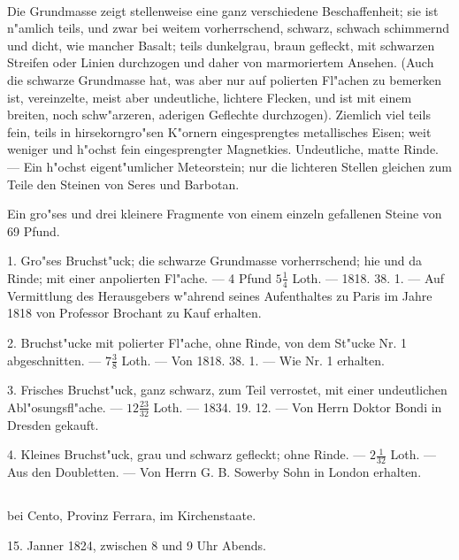 \documentclass[a4paper, 11pt, oneside, polutonikogreek, german]{article}
\begin{document}
\paragraph{}
Die Grundmasse zeigt stellenweise eine ganz verschiedene Beschaffenheit; sie ist n"amlich teils, und zwar bei weitem vorherrschend, schwarz, schwach schimmernd und dicht, wie mancher Basalt; teils dunkelgrau, braun gefleckt, mit schwarzen Streifen oder Linien durchzogen und daher von marmoriertem Ansehen. (Auch die schwarze Grundmasse hat, was aber nur auf polierten Fl"achen zu bemerken ist, vereinzelte, meist aber undeutliche, lichtere Flecken, und ist mit einem breiten, noch schw"arzeren, aderigen Geflechte durchzogen). Ziemlich viel teils fein, teils in hirsekorngro"sen K"ornern eingesprengtes metallisches Eisen; weit weniger und h"ochst fein eingesprengter Magnetkies. Undeutliche, matte Rinde. --- Ein h"ochst eigent"umlicher Meteorstein; nur die lichteren Stellen gleichen zum Teile den Steinen von Seres und Barbotan.

Ein gro"ses und drei kleinere Fragmente von einem einzeln gefallenen Steine von 69 Pfund.

1. Gro"ses Bruchst"uck; die schwarze Grundmasse vorherrschend; hie und da Rinde; mit einer anpolierten Fl"ache. --- 4 Pfund $\mathfrak{5\frac{1}{4}}$ Loth. --- 1818. 38. 1. --- Auf Vermittlung des Herausgebers w"ahrend seines Aufenthaltes zu Paris im Jahre 1818 von Professor Brochant zu Kauf erhalten.

2. Bruchst"ucke mit polierter Fl"ache, ohne Rinde, von dem St"ucke Nr. 1 abgeschnitten. --- $\mathfrak{7\frac{3}{8}}$ Loth. --- Von 1818. 38. 1. --- Wie Nr. 1 erhalten.

3. Frisches Bruchst"uck, ganz schwarz, zum Teil verrostet, mit einer undeutlichen Abl"osungsfl"ache. --- $\mathfrak{12\frac{23}{32}}$ Loth. --- 1834. 19. 12. --- Von Herrn Doktor Bondi in Dresden gekauft.

4. Kleines Bruchst"uck, grau und schwarz gefleckt; ohne Rinde. --- $\mathfrak{2\frac{1}{32}}$ Loth. --- Aus den Doubletten. --- Von Herrn G. B. Sowerby Sohn in London erhalten.
\subsection[\swabfamily {Renazzo.}]{}
\begin{center}

bei Cento, Provinz Ferrara, im Kirchenstaate.

15. Janner 1824, zwischen 8 und 9 Uhr Abends.
\end{center}
\end{document}

